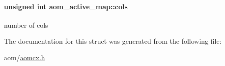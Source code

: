 \paragraph[{\texorpdfstring{cols}{cols}}]{\setlength{\rightskip}{0pt plus 5cm}unsigned int aom\+\_\+active\+\_\+map\+::cols}\hypertarget{structaom__active__map_a3a105e0d8f2643cdc542e2f078b9e6b2}{}\label{structaom__active__map_a3a105e0d8f2643cdc542e2f078b9e6b2}
number of cols 

The documentation for this struct was generated from the following file\+:\begin{DoxyCompactItemize}
\item 
aom/\hyperlink{aomcx_8h}{aomcx.\+h}\end{DoxyCompactItemize}
